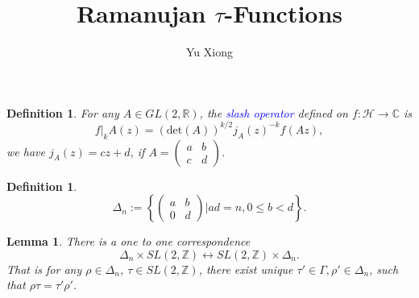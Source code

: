 \documentclass{article}
\newtheorem{definition}[theorem]{Definition}
\newtheorem{lemma}[theorem]{Lemma}
\begin{document}
\title{Ramanujan $\tau$-Functions}
\author{Yu Xiong}
\maketitle
\begin{definition}
    For any $A \in GL(2,\mathbb{R})$, the \textcolor{blue}{slash operator} defined on $f:\mathcal{H}\to \mathbb{C}$ is
    \[
        f|_kA(z)=(\text{det}(A))^{k/2}j_A(z)^{-k}f(Az),
    \] we have $j_A(z)=cz+d$, if $A=\begin{pmatrix}
        a&b\\
        c&d
    \end{pmatrix}$.
\end{definition}
\begin{definition}
    \[\Delta_n:=\left\{\begin{pmatrix}
        a&b\\
        0&d
    \end{pmatrix}\big| ad=n, 0\leq b < d\right\}.\]
\end{definition}
\begin{lemma}
    There is a one to one correspondence \[\Delta_n\times SL(2,\mathbb{Z})\leftrightarrow  SL(2,\mathbb{Z}) \times \Delta_n.\] That is for any $\rho \in \Delta_n$, $\tau \in SL(2,\mathbb{Z})$, there exist unique $\tau'\in \Gamma,\rho' \in \Delta_n$, such that $\rho \tau =\tau' \rho'$.
\end{lemma}
\end{document}
